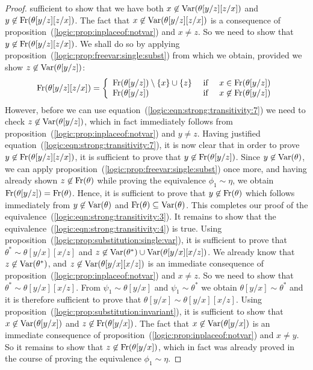 \begin{proof}
sufficient to show that we have both
$x\not\in\mbox{\rm Var}(\theta[y/z][z/x])$ and
$y\not\in\mbox{\rm Fr}(\theta[y/z][z/x])$. The fact that
$x\not\in\mbox{\rm Var}(\theta[y/z][z/x])$ is a consequence of
proposition~(\ref{logic:prop:inplaceof:notvar}) and $x\neq z$. So we
need to show that $y\not\in\mbox{\rm Fr}(\theta[y/z][z/x])$. We shall do so
by applying proposition~(\ref{logic:prop:freevar:single:subst}) from
which we obtain, provided we show $z\not\in\mbox{\rm Var}(\theta[y/z])$:
    \begin{equation}\label{logic:eqn:strong:transitivity:7}
    \free(\theta[y/z][z/x])=\left\{\begin{array}{lcl}
    \free(\theta[y/z])\setminus\{x\}\cup\{z\}&\mbox{\ if\ }&x\in\free(\theta[y/z])\\
    \free(\theta[y/z])&\mbox{\ if\ }&x\not\in\free(\theta[y/z])
    \end{array}
    \right.
    \end{equation}
However, before we can use
equation~(\ref{logic:eqn:strong:transitivity:7}) we need to check
$z\not\in\mbox{\rm Var}(\theta[y/z])$, which in fact immediately follows from
proposition~(\ref{logic:prop:inplaceof:notvar}) and $y\neq z$.
Having justified equation~(\ref{logic:eqn:strong:transitivity:7}),
it is now clear that in order to prove
$y\not\in\mbox{\rm Fr}(\theta[y/z][z/x])$, it is sufficient to prove that
$y\not\in\mbox{\rm Fr}(\theta[y/z])$. Since $y\not\in\mbox{\rm Var}(\theta)$, we can
apply proposition~(\ref{logic:prop:freevar:single:subst}) once more,
and having already shown $z\not\in\mbox{\rm Fr}(\theta)$ while proving the
equivalence $\phi_{1}\sim\eta$, we obtain
$\mbox{\rm Fr}(\theta[y/z])=\mbox{\rm Fr}(\theta)$. Hence, it is sufficient to prove
that $y\not\in\mbox{\rm Fr}(\theta)$ which follows immediately from
$y\not\in\mbox{\rm Var}(\theta)$ and $\mbox{\rm Fr}(\theta)\subseteq\mbox{\rm Var}(\theta)$.
This completes our proof of the
equivalence~(\ref{logic:eqn:strong:transitivity:3}). It remains to
show that the equivalence~(\ref{logic:eqn:strong:transitivity:4}) is
true. Using proposition~(\ref{logic:prop:substitution:single:var}),
it is sufficient to prove that $\theta^{*}\sim\theta[y/x][x/z]$ and
$z\not\in\mbox{\rm Var}(\theta^{*})\cup\mbox{\rm Var}(\theta[y/x][x/z])$. We already
know that $z\not\in\mbox{\rm Var}(\theta^{*})$, and
$z\not\in\mbox{\rm Var}(\theta[y/x][x/z])$ is an immediate consequence of
proposition~(\ref{logic:prop:inplaceof:notvar}) and $x\neq z$. So we
need to show that $\theta^{*}\sim\theta[y/x][x/z]$. From
$\psi_{1}\sim\theta[y/x]$ and $\psi_{1}\sim\theta^{*}$ we obtain
$\theta[y/x]\sim\theta^{*}$ and it is therefore sufficient to prove
that $\theta[y/x]\sim\theta[y/x][x/z]$. Using
proposition~(\ref{logic:prop:substitution:invariant}), it is
sufficient to show that $x\not\in\mbox{\rm Var}(\theta[y/x])$ and
$z\not\in\mbox{\rm Fr}(\theta[y/x])$. The fact that
$x\not\in\mbox{\rm Var}(\theta[y/x])$ is an immediate consequence of
proposition~(\ref{logic:prop:inplaceof:notvar}) and $x\neq y$. So it
remains to show that $z\not\in\mbox{\rm Fr}(\theta[y/x])$, which in fact was
already proved in the course of proving the equivalence
$\phi_{1}\sim\eta$.
\end{proof}


